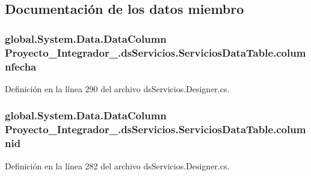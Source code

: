 \subsection{Documentación de los datos miembro}
\hypertarget{class_proyecto___integrador__3_1_1ds_servicios_1_1_servicios_data_table_a959f072e2c0689f46c30f9bc31b2cf16}{
\subsubsection[{columnfecha}]{\setlength{\rightskip}{0pt plus 5cm}global.\-System.\-Data.\-Data\-Column Proyecto\-\_\-\-Integrador\-\_.\-ds\-Servicios.\-Servicios\-Data\-Table.\-columnfecha\hspace{0.3cm}{\ttfamily [private]}}}\label{class_proyecto___integrador__3_1_1ds_servicios_1_1_servicios_data_table_a959f072e2c0689f46c30f9bc31b2cf16}


Definición en la línea 290 del archivo ds\-Servicios.\-Designer.\-cs.

\hypertarget{class_proyecto___integrador__3_1_1ds_servicios_1_1_servicios_data_table_a42ed0070aba427354954b37e5955b03b}{
\subsubsection[{columnid}]{\setlength{\rightskip}{0pt plus 5cm}global.\-System.\-Data.\-Data\-Column Proyecto\-\_\-\-Integrador\-\_.\-ds\-Servicios.\-Servicios\-Data\-Table.\-columnid\hspace{0.3cm}{\ttfamily [private]}}}\label{class_proyecto___integrador__3_1_1ds_servicios_1_1_servicios_data_table_a42ed0070aba427354954b37e5955b03b}


Definición en la línea 282 del archivo ds\-Servicios.\-Designer.\-cs.

